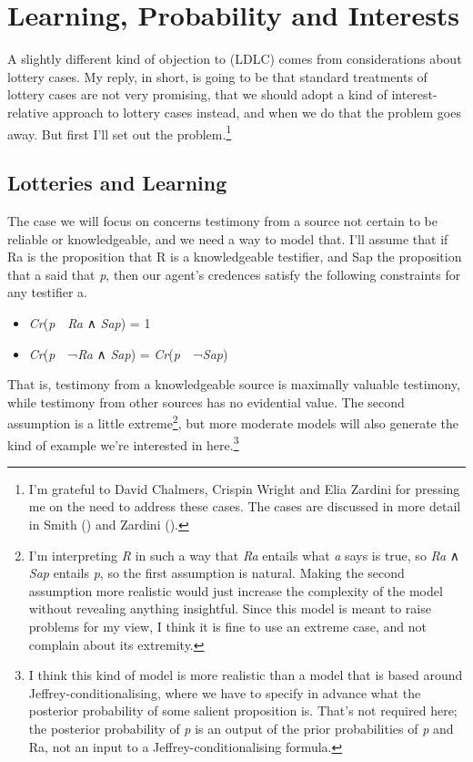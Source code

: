 \documentclass[
  11pt,
  letterpaper,
  DIV=11,
  numbers=noendperiod,
  twoside]{scrartcl}
\providecommand{\tightlist}{%
  \setlength{\itemsep}{0pt}\setlength{\parskip}{0pt}}
\begin{document}
\section{Learning, Probability and
Interests}\label{learning-probability-and-interests}

A slightly different kind of objection to (LDLC) comes from
considerations about lottery cases. My reply, in short, is going to be
that standard treatments of lottery cases are not very promising, that
we should adopt a kind of interest-relative approach to lottery cases
instead, and when we do that the problem goes away. But first I'll set
out the problem.\footnote{I'm grateful to David Chalmers, Crispin Wright
  and Elia Zardini for pressing me on the need to address these cases.
  The cases are discussed in more detail in Smith
  () and Zardini
  ().}

\subsection{Lotteries and Learning}\label{lotteries-and-learning}

The case we will focus on concerns testimony from a source not certain
to be reliable or knowledgeable, and we need a way to model that. I'll
assume that if Ra is the proposition that R is a knowledgeable
testifier, and Sap the proposition that a said that \emph{p}, then our
agent's credences satisfy the following constraints for any testifier a.

\begin{itemize}
\tightlist
\item
  \emph{Cr}(\emph{p}~\textbar~\emph{Ra} ∧ \emph{Sap}) = 1
\item
  \emph{Cr}(\emph{p}~\textbar~¬\emph{Ra} ∧ \emph{Sap}) =
  \emph{Cr}(\emph{p}~\textbar~¬\emph{Sap})
\end{itemize}

That is, testimony from a knowledgeable source is maximally valuable
testimony, while testimony from other sources has no evidential value.
The second assumption is a little extreme\footnote{I'm interpreting
  \emph{R} in such a way that \emph{Ra} entails what \emph{a} says is
  true, so \emph{Ra} ∧ \emph{Sap} entails \emph{p}, so the first
  assumption is natural. Making the second assumption more realistic
  would just increase the complexity of the model without revealing
  anything insightful. Since this model is meant to raise problems for
  my view, I think it is fine to use an extreme case, and not complain
  about its extremity.}, but more moderate models will also generate the
kind of example we're interested in here.\footnote{I think this kind of
  model is more realistic than a model that is based around
  Jeffrey-conditionalising, where we have to specify in advance what the
  posterior probability of some salient proposition is. That's not
  required here; the posterior probability of \emph{p} is an output of
  the prior probabilities of \emph{p} and Ra, not an input to a
  Jeffrey-conditionalising formula.}
\end{document}

